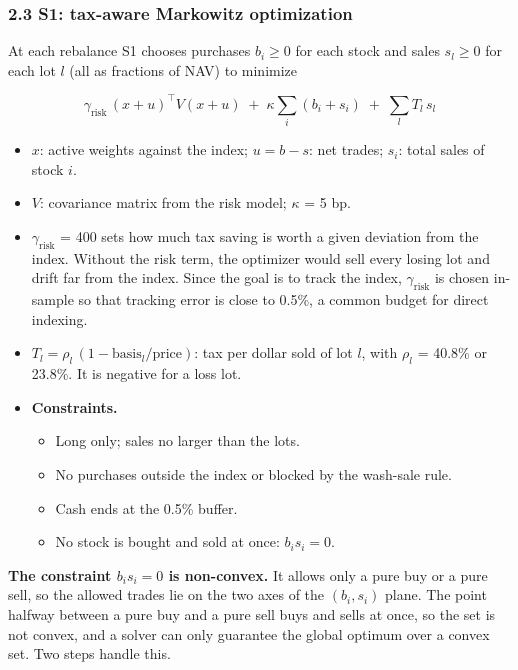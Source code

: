 \documentclass[
  11pt,
]{article}
\providecommand{\tightlist}{%
  \setlength{\itemsep}{0pt}\setlength{\parskip}{0pt}}
\begin{document}
\hypertarget{s1-tax-aware-markowitz-optimization}{%
\subsubsection{2.3 S1: tax-aware Markowitz optimization}\label{s1-tax-aware-markowitz-optimization}}

At each rebalance S1 chooses purchases \(b_i \ge 0\) for each stock and sales \(s_l \ge 0\) for each lot \(l\) (all as fractions of NAV) to minimize

\[\gamma_{\text{risk}}\,(x+u)^\top V (x+u) \;+\; \kappa \textstyle\sum_i (b_i + s_i) \;+\; \sum_l T_l\, s_l\]

\begin{itemize}
\tightlist
\item
  \(x\): active weights against the index; \(u = b - s\): net trades; \(s_i\): total sales of stock \(i\).
\item
  \(V\): covariance matrix from the risk model; \(\kappa\) = 5 bp.
\item
  \(\gamma_{\text{risk}}\) = 400 sets how much tax saving is worth a given deviation from the index. Without the risk term, the optimizer would sell every losing lot and drift far from the index. Since the goal is to track the index,
  \(\gamma_{\text{risk}}\) is chosen in-sample so that tracking error is close to 0.5\%, a common budget for direct indexing.
\item
  \(T_l = \rho_l\,(1 - \text{basis}_l/\text{price})\): tax per dollar sold of lot \(l\), with \(\rho_l\) = 40.8\% or 23.8\%. It is negative for a loss lot.
\item
  \textbf{Constraints.}

  \begin{itemize}
  \tightlist
  \item
    Long only; sales no larger than the lots.
  \item
    No purchases outside the index or blocked by the wash-sale rule.
  \item
    Cash ends at the 0.5\% buffer.
  \item
    No stock is bought and sold at once: \(b_i s_i = 0\).
  \end{itemize}
\end{itemize}

\textbf{The constraint \(b_i s_i = 0\) is non-convex.} It allows only a pure buy or a pure sell, so the allowed trades lie on the two axes of the \((b_i, s_i)\) plane. The point halfway between a pure buy and a pure sell buys and sells at once, so
the set is not convex, and a solver can only guarantee the global optimum over a convex set. Two steps handle this.
\end{document}
